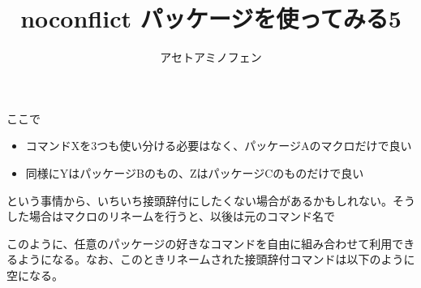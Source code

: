 \documentclass{jsarticle}
\title{\textsf{noconflict} パッケージを使ってみる5}
\author{アセトアミノフェン}
\begin{document}
\maketitle





ここで
\begin{itemize}
\item コマンドXを3つも使い分ける必要はなく、パッケージAのマクロだけで良い
\item 同様にYはパッケージBのもの、ZはパッケージCのものだけで良い
\end{itemize}
という事情から、いちいち接頭辞付にしたくない場合があるかもしれない。そうした場合はマクロのリネームを行うと、以後は元のコマンド名で



このように、任意のパッケージの好きなコマンドを自由に組み合わせて利用できるようになる。なお、このときリネームされた接頭辞付コマンドは以下のように空になる。



\end{document}
